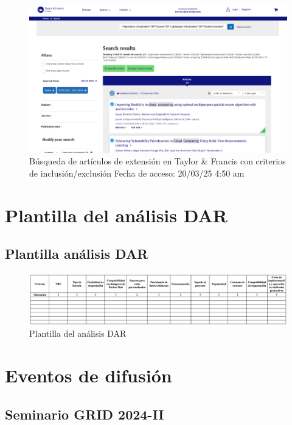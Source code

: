 \FloatBarrier\begin{figure}[H]
	\centering
	\includegraphics[width=\textwidth,keepaspectratio]{apendices/BD/criterios/TF-ind.png}
	\caption{Búsqueda de artículos de extensión en Taylor \& Francis con criterios de inclusión/exclusión
		Fecha de acceso: 20/03/25 4:50 am
	}\label{fig:busqueda30}
\end{figure}
\FloatBarrier\chapter{Plantilla del análisis DAR}
\section{Plantilla análisis DAR}

\begin{figure}[H]
	\centering
	\includegraphics[width=\textwidth,height=0.85\textheight,keepaspectratio]{apendices/plantilla-DAR.png}
	\caption{Plantilla del análisis DAR}\label{fig:tabla-plantilla-dar}
\end{figure}
\FloatBarrier\chapter{Eventos de difusión}
\section{Seminario GRID 2024-II}


